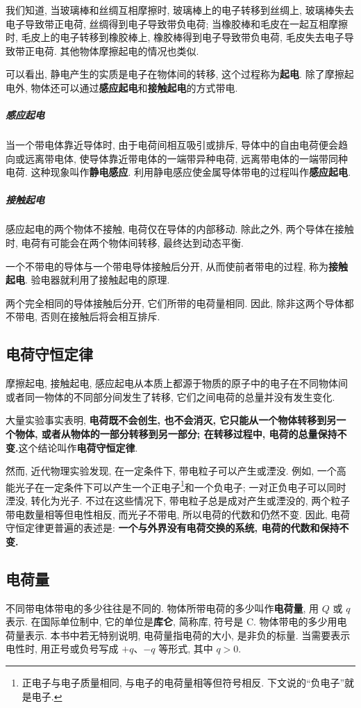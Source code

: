 \documentclass[UTF8,openany,fontset=fandol]{ctexbook}
\theoremstyle{chinesetextbook}
\begin{document}
我们知道, 当玻璃棒和丝绸互相摩擦时, 玻璃棒上的电子转移到丝绸上, 玻璃棒失去电子导致带正电荷, 丝绸得到电子导致带负电荷; 当橡胶棒和毛皮在一起互相摩擦时, 毛皮上的电子转移到橡胶棒上, 橡胶棒得到电子导致带负电荷, 毛皮失去电子导致带正电荷. 其他物体摩擦起电的情况也类似.

可以看出, 静电产生的实质是电子在物体间的转移, 这个过程称为\textbf{起电}. 除了摩擦起电外, 物体还可以通过\textbf{感应起电}和\textbf{接触起电}的方式带电.

\subparagraph{感应起电} 当一个带电体靠近导体时, 由于电荷间相互吸引或排斥, 导体中的自由电荷便会趋向或远离带电体, 使导体靠近带电体的一端带异种电荷, 远离带电体的一端带同种电荷. 这种现象叫作\textbf{静电感应}. 利用静电感应使金属导体带电的过程叫作\textbf{感应起电}.

\subparagraph{接触起电} 感应起电的两个物体不接触, 电荷仅在导体的内部移动. 除此之外, 两个导体在接触时, 电荷有可能会在两个物体间转移, 最终达到动态平衡.

一个不带电的导体与一个带电导体接触后分开, 从而使前者带电的过程, 称为\textbf{接触起电}. 验电器就利用了接触起电的原理.

两个完全相同的导体接触后分开, 它们所带的电荷量相同. 因此, 除非这两个导体都不带电, 否则在接触后将会相互排斥.
\subsection{电荷守恒定律}
摩擦起电, 接触起电, 感应起电从本质上都源于物质的原子中的电子在不同物体间或者同一物体的不同部分间发生了转移, 它们之间电荷的总量并没有发生变化.

大量实验事实表明, \textbf{电荷既不会创生, 也不会消灭, 它只能从一个物体转移到另一个物体, 或者从物体的一部分转移到另一部分; 在转移过程中, 电荷的总量保持不变.}这个结论叫作\textbf{电荷守恒定律}.

然而, 近代物理实验发现, 在一定条件下, 带电粒子可以产生或湮没. 例如, 一个高能光子在一定条件下可以产生一个正电子\footnote{正电子与电子质量相同, 与电子的电荷量相等但符号相反. 下文说的“负电子”就是电子.}和一个负电子; 一对正负电子可以同时湮没, 转化为光子. 不过在这些情况下, 带电粒子总是成对产生或湮没的, 两个粒子带电数量相等但电性相反, 而光子不带电, 所以电荷的代数和仍然不变. 因此, 电荷守恒定律更普遍的表述是: \textbf{一个与外界没有电荷交换的系统, 电荷的代数和保持不变.}
\subsection{电荷量}
不同带电体带电的多少往往是不同的. 物体所带电荷的多少叫作\textbf{电荷量}, 用 $Q$ 或 $q$ 表示. 在国际单位制中, 它的单位是\textbf{库仑}, 简称库, 符号是 C. 物体带电的多少用电荷量表示. 本书中若无特别说明, 电荷量指电荷的大小, 是非负的标量. 当需要表示电性时, 用正号或负号写成 $+q$、$-q$ 等形式, 其中 $q>0$.
\end{document}
